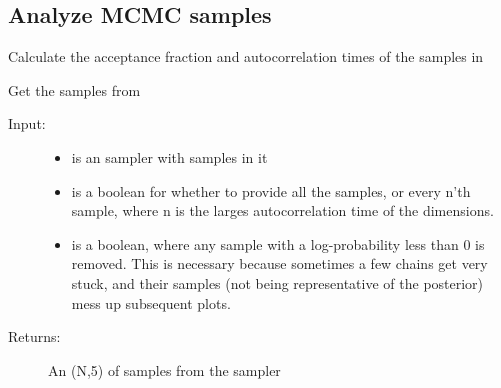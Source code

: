 \documentclass[letterpaper,10pt,english]{sphinxmanual}
\begin{document}
\subsection{Analyze MCMC samples}
\label{code_mcmc:module-mcmc}\label{code_mcmc:analyze-mcmc-samples}\label{code_mcmc:module-mcmc}

\begin{fulllineitems}
\label{code_mcmc:mcmc.chain_statistics}
Calculate the acceptance fraction and autocorrelation times of the samples in 

\end{fulllineitems}


\begin{fulllineitems}
\label{code_mcmc:mcmc.get_samples}
Get the samples from 
\begin{description}
\item[{Input:}] \leavevmode\begin{itemize}
\item {} 
 is an  sampler with samples in it

\item {} 
 is a boolean for whether to provide all the samples, or every n'th sample, where n is the larges autocorrelation time of the dimensions.

\item {} 
 is a boolean, where any sample with a log-probability less than 0 is removed. This is necessary because sometimes a few chains get very stuck, and their samples (not being representative of the posterior) mess up subsequent plots.

\end{itemize}

\item[{Returns:}] \leavevmode
An (N,5)  of samples from the sampler

\end{description}

\end{fulllineitems}
\end{document}
